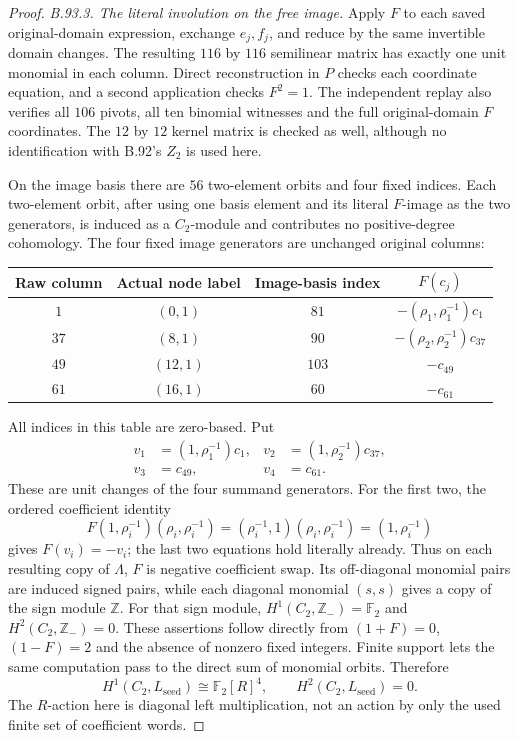 \begin{proof}
\emph{B.93.3. The literal involution on the free image.}
Apply $F$ to each saved original-domain expression, exchange
$e_j,f_j$, and reduce by the same invertible domain changes.
The resulting $116$ by $116$ semilinear matrix has exactly one
unit monomial in each column. Direct reconstruction in $P$ checks
each coordinate equation, and a second application checks $F^2=1$.
The independent replay
also verifies all $106$ pivots, all ten binomial witnesses and
the full original-domain $F$ coordinates. The $12$ by $12$ kernel
matrix is checked as well, although no identification with B.92's
$Z_2$ is used here.

On the image basis there are $56$ two-element orbits and four
fixed indices. Each two-element orbit, after using one basis
element and its literal $F$-image as the two generators, is induced
as a $C_2$-module and contributes no positive-degree cohomology.
The four fixed image generators are unchanged original columns:
\begin{center}
\begin{tabular}{cccc}
Raw column&Actual node label&Image-basis index&$F(c_j)$\\\hline
$1$&$(0,1)$&$81$&$-(\rho_1,\rho_1^{-1})c_1$\\
$37$&$(8,1)$&$90$&$-(\rho_2,\rho_2^{-1})c_{37}$\\
$49$&$(12,1)$&$103$&$-c_{49}$\\
$61$&$(16,1)$&$60$&$-c_{61}$
\end{tabular}
\end{center}
All indices in this table are zero-based. Put
\begin{equation}\label{eq:B93-four-anti-chains}
 \begin{aligned}
 v_1&=(1,\rho_1^{-1})c_1,&
 v_2&=(1,\rho_2^{-1})c_{37},\\
 v_3&=c_{49},&v_4&=c_{61}.
 \end{aligned}
\end{equation}
These are unit changes of the four summand generators. For the
first two, the ordered coefficient identity
\[
 F(1,\rho_i^{-1})(\rho_i,\rho_i^{-1})
       =(\rho_i^{-1},1)(\rho_i,\rho_i^{-1})
       =(1,\rho_i^{-1})
\]
gives $F(v_i)=-v_i$; the last two equations hold literally already.
Thus on each resulting copy of $\Lambda$, $F$ is negative
coefficient swap. Its off-diagonal monomial pairs are induced
signed pairs, while each diagonal monomial $(s,s)$ gives a copy
of the sign module $\mathbb Z$. For that sign module,
$H^1(C_2,\mathbb Z_{-})=\mathbb F_2$ and
$H^2(C_2,\mathbb Z_{-})=0$. These assertions follow directly
from $(1+F)=0$, $(1-F)=2$ and the absence of nonzero fixed
integers. Finite support lets the same computation pass to the
direct sum of monomial orbits. Therefore
\[
 H^1(C_2,L_{\mathrm{seed}})\cong\mathbb F_2[R]^4,
 \qquad H^2(C_2,L_{\mathrm{seed}})=0.
\]
The $R$-action here is diagonal left multiplication, not an
action by only the used finite set of coefficient words.


\end{proof}
